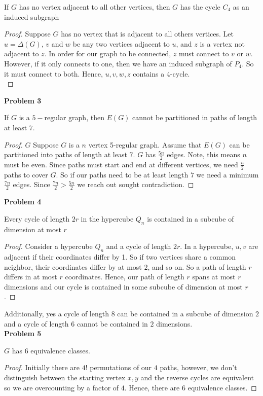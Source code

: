 \documentclass{article}
\newenvironment{claim}[2][Claim]{\begin{trivlist}
		\item[\hskip \labelsep {\bfseries #1}\hskip \labelsep {\bfseries #2}]}{\end{trivlist}}
\begin{document}
\begin{claim}{b}
	If $G$ has no vertex adjacent to all other vertices, then $G$ has the cycle $C_4$ as an induced subgraph
\end{claim}

\begin{proof}
	Suppose $G$ has no vertex that is adjacent to all others vertices. Let $u  = \Delta(G)$, $v$ and $w$ be any two vertices adjacent to $u$, and $z$ is a vertex not adjacent to $z$. In order for our graph to be connected, $z$ must connect to $v$ or $w$. 
	However, if it only connects to one, then we have an induced subgraph of $P_4$. So it must connect to both. Hence, $u,v,w,z$ contains a 4-cycle.\\
\end{proof}

\noindent\textbf{Problem 3}
\begin{claim}{}
	If $G$ is a $5-$regular graph, then $E(G)$ cannot be partitioned in paths of length at least $7$.
\end{claim}
\begin{proof}
 $G$ Suppose $G$ is a $n$ vertex 5-regular graph. Assume that $E(G)$ can be partitioned into paths of length at least $7$. $G$ has $\frac{5n}{2}$ edges. Note, this means $n$ must be even. Since paths must start and end at different vertices, we need $\frac{n}{2}$ paths to cover $G$. So if our paths need to be at least length $7$ we need a minimum $\frac{7n}{2}$ edges. Since $\frac{7n}{2} > \frac{5n}{2}$ we reach out sought contradiction.
\end{proof}
\newpage
\noindent\textbf{Problem 4}
\begin{claim}{}
	Every cycle of length $2r$ in the hypercube $Q_n$ is contained in a subcube of dimension at most $r$
\end{claim}
\begin{proof}
	Consider a hypercube $Q_n$ and a cycle of length $2r$. In a hypercube, $u,v$ are adjacent if their coordinates differ by 1. So if two vertices share a common neighbor, their coordinates differ by at most $2$, and so on. So a path of length $r$ differs in at most $r$ coordinates. Hence, our path of length $r$ spans at most $r$ dimensions and our cycle is contained in some subcube of dimension at most $r$.
\end{proof}
Additionally, yes a cycle of length 8 can be contained in a subcube of dimension $2$ and
a cycle of length $6$ cannot be contained in $2$ dimensions.\\

\noindent\textbf{Problem 5}
\begin{claim}{5}
	$G$ has $6$ equivalence classes.
\end{claim}
\begin{proof}
Initially there are $4!$ permutations of our $4$ paths, however, we don't distinguish between the starting vertex $x,y$ and the reverse cycles are equivalent so we are overcounting by a factor of $4$. Hence, there are $6$ equivalence classes.
\end{proof}
\end{document}
